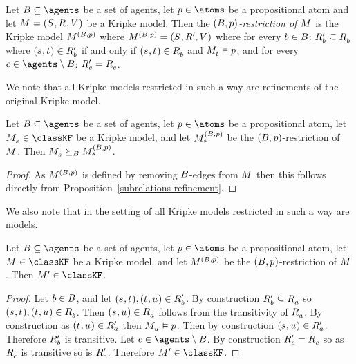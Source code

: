 \begin{definition}
Let $\agentsB \subseteq \agents$ be a set of agents, let $\atomP \in \atoms$ be a propositional atom and let $\kModelAndTuple$ be a Kripke model.
Then the {\em $(\agentsB, \atomP)$-restriction of $\kModel$} is the Kripke model $\kModel[(\agentsB, \atomP)]$ where $\kModel[(\agentsB, \atomP)] = (\kStates, \kAccessibilityP{}, \kValuation)$ where for every $\agentB \in \agentsB$: $\kAccessibilityPB \subseteq \kAccessibilityB$ where $(\kStateS, \kStateT) \in \kAccessibilityPB$ if and only if $(\kStateS, \kStateT) \in \kAccessibilityB$ and $\kPModel{\kStateT} \entails \atomP$; and for every $\agentC \in \agents \setminus \agentsB$: $\kAccessibilityPC = \kAccessibilityC$.
\end{definition}

We note that all Kripke models restricted in such a way are refinements of the original Kripke model.

\begin{lemma}\label{rml-k4-restriction-refinement}
Let $\agentsB \subseteq \agents$ be a set of agents, let $\atomP \in \atoms$ be a propositional atom, let $\kPModel{\kStateS} \in \classKF$ be a Kripke model, and let $\kPModel[(\agentsB, \atomP)]{\kStateS}$ be the $(\agentsB, \atomP)$-restriction of $\kModel$.
Then $\kPModel{\kStateS} \simulatesBs \kPModel[(\agentsB, \atomP)]{\kStateS}$.
\end{lemma}

\begin{proof}
As $\kModel[(\agentsB, \atomP)]$ is defined by removing $\agentsB$-edges from $\kModel$ then this follows directly from Proposition~\ref{subrelations-refinement}.
\end{proof}

We also note that in the setting of \classKF{} all Kripke models restricted in such a way are \classKF{} models.

\begin{lemma}\label{rml-k4-restriction-k4}
Let $\agentsB \subseteq \agents$ be a set of agents, let $\atomP \in \atoms$ be a propositional atom, let $\kModel \in \classKF$ be a Kripke model, and let $\kModel[(\agentsB, \atomP)]$ be the $(\agentsB, \atomP)$-restriction of $\kModel$.
Then $\kModelP \in \classKF$.
\end{lemma}

\begin{proof}
Let $\agentB \in \agentsB$, and let $(\kStateS, \kStateT), (\kStateT, \kStateU) \in \kAccessibilityPB$.
By construction $\kAccessibilityPB \subseteq \kAccessibilityA$ so $(\kStateS, \kStateT), (\kStateT, \kStateU) \in \kAccessibilityB$.
Then $(\kStateS, \kStateU) \in \kAccessibilityA$ follows from the transitivity of $\kAccessibilityA$.
By construction as $(\kStateT, \kStateU) \in \kAccessibilityPA$ then $\kPModel{\kStateU} \entails \atomP$.
Then by construction $(\kStateS, \kStateU) \in \kAccessibilityPA$.
Therefore $\kAccessibilityPB$ is transitive.
Let $\agentC \in \agents \setminus \agentsB$.
By construction $\kAccessibilityPC = \kAccessibilityC$ so as $\kAccessibilityC$ is transitive so is $\kAccessibilityPC$.
Therefore $\kModelP \in \classKF$.
\end{proof}

